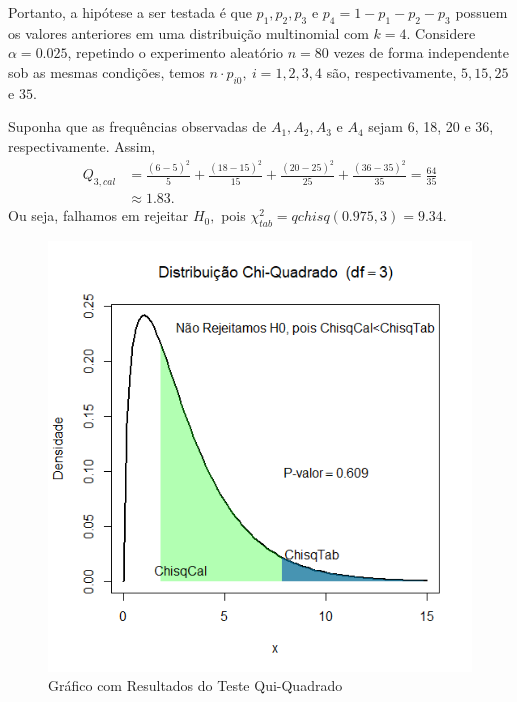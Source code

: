 \documentclass[12pt]{beamer}
\begin{document}
\begin{frame}{}
\begin{block}{}
\justifying
Portanto, a hipótese a ser testada é que $p_1, p_2, p_3$ e $p_4 = 1 - p_1 - p_2 - p_3$ possuem os valores anteriores em uma distribuição multinomial com $k = 4$. Considere $\alpha=0.025$, repetindo o experimento aleatório $n = 80$ vezes de forma independente sob as mesmas condições, temos $n \cdot p_{i0},~i = 1, 2, 3, 4$ são, respectivamente, $5, 15, 25$ e $35.$
\end{block}
\pause
\begin{block}{}
\justifying
Suponha que as frequências observadas de $A_1, A_2, A_3$ e $A_4$ sejam 6, 18, 20 e 36, respectivamente. Assim, 
\begin{align*}
    Q_{3,cal}&=\frac{(6 - 5)^2}{5} + \frac{(18 - 15)^2}{15} + \frac{(20 - 25)^2}{25} + \frac{(36 - 35)^2}{35} = \frac{64}{35}\\ 
    &\approx 1.83.
\end{align*}
Ou seja, falhamos em rejeitar $H_{0},$ pois $\chi_{tab}^{2}=qchisq(0.975,3)=9.34.$
\end{block}
\end{frame}

\begin{frame}{}
\begin{block}{}
\begin{figure}
    \centering
    \includegraphics[scale=0.5]{figs/EX2Chisq.png}
    \caption{Gráfico com Resultados do Teste Qui-Quadrado}
    \label{fig:enter-label}
\end{figure}
\end{block}
\end{frame}
\end{document}
